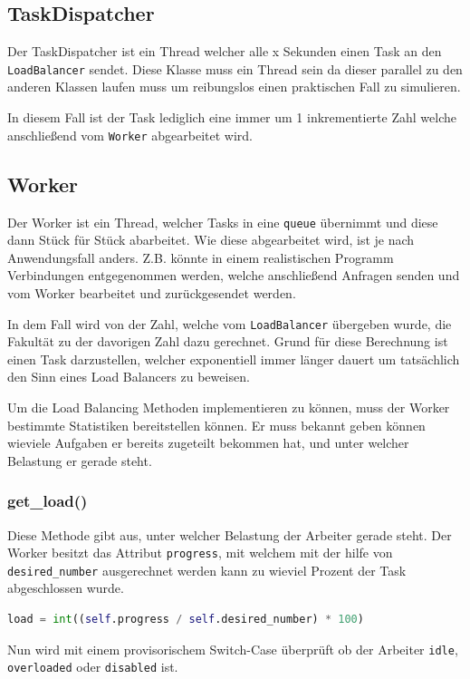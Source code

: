 \subsection{TaskDispatcher}
Der TaskDispatcher ist ein Thread welcher alle x Sekunden einen Task an den \verb|LoadBalancer| sendet. Diese Klasse muss ein Thread sein da dieser parallel zu den anderen Klassen laufen muss um reibungslos einen praktischen Fall zu simulieren. 

In diesem Fall ist der Task lediglich eine immer um 1 inkrementierte Zahl welche anschließend vom \verb|Worker| abgearbeitet wird. 

\subsection{Worker}
Der Worker ist ein Thread, welcher Tasks in eine \verb|queue| übernimmt und diese dann Stück für Stück abarbeitet. Wie diese abgearbeitet wird, ist je nach Anwendungsfall anders. Z.B. könnte in einem realistischen Programm Verbindungen entgegenommen werden, welche anschließend Anfragen senden und vom Worker bearbeitet und zurückgesendet werden. 

In dem Fall wird von der Zahl, welche vom \verb|LoadBalancer| übergeben wurde, die Fakultät zu der davorigen Zahl dazu gerechnet. Grund für diese Berechnung ist einen Task darzustellen, welcher exponentiell immer länger dauert um tatsächlich den Sinn eines Load Balancers zu beweisen.

Um die Load Balancing Methoden implementieren zu können, muss der Worker bestimmte Statistiken bereitstellen können. Er muss bekannt geben können wieviele Aufgaben er bereits zugeteilt bekommen hat, und unter welcher Belastung er gerade steht. 

\subsubsection{get\_load()}
Diese Methode gibt aus, unter welcher Belastung der Arbeiter gerade steht. Der Worker besitzt das Attribut \verb|progress|, mit welchem mit der hilfe von \verb|desired_number| ausgerechnet werden kann zu wieviel Prozent der Task abgeschlossen wurde.

\begin{lstlisting}[language=python]
load = int((self.progress / self.desired_number) * 100)
\end{lstlisting}

Nun wird mit einem provisorischem Switch-Case überprüft ob der Arbeiter \verb|idle|, \verb|overloaded| oder \verb|disabled| ist. 

